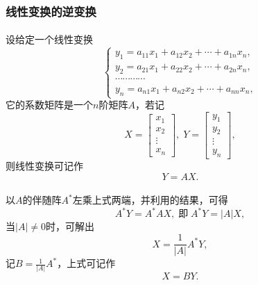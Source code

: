\subsubsection{线性变换的逆变换}
\paragraph{}
设给定一个线性变换
\begin{equation}
  \left\{\begin{array}{l}
    y_1 = a_{11}x_1 + a_{12}x_2 + \cdots + a_{1n}x_n, \\
    y_2 = a_{21}x_1 + a_{22}x_2 + \cdots + a_{2n}x_n, \\
    \cdots\cdots\cdots\cdots \\
    y_n = a_{n1}x_1 + a_{n2}x_2 + \cdots + a_{nn}x_n,
  \end{array} \right.
\end{equation}
它的系数矩阵是一个$n$阶矩阵$A$，若记
\begin{equation*}
  X = \left[\begin{array}{c}
    x_1 \\
    x_2 \\
    \vdots \\
    x_n
  \end{array}\right],\;
  Y = \left[\begin{array}{c}
    y_1 \\
    y_2 \\
    \vdots \\
    y_n
  \end{array}\right],
\end{equation*}
则线性变换可记作
\begin{equation}
  \label{Y=AX}
  Y=AX.
\end{equation}

\paragraph{}
以$A$的伴随阵$A^*$左乘上式两端，并利用的结果，可得
\begin{equation*}
  A^*Y = A^*AX, \;\text{即}\; A^*Y = |A|X,
\end{equation*}
当$|A|\neq 0$时，可解出
\begin{equation*}
  X = \frac{1}{|A|}A^*Y,
\end{equation*}
记$B=\frac{1}{|A|}A^*$，上式可记作
\begin{equation}
  \label{X=BY}
  X = BY.
\end{equation}


